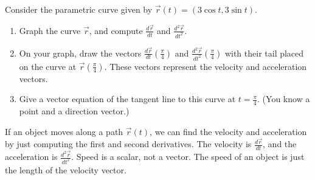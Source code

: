 \begin{problem}  
%
Consider the parametric curve given by $\vec r(t)=( 3\cos t, 3\sin t )$. 
\begin{enumerate}
\item Graph the curve $\vec r$, and compute $\frac{d\vec r}{dt}$ and $\frac{d^2\vec r}{dt^2}$. 
\item On your graph, draw the vectors $\frac{d\vec r}{dt}\left(\frac{\pi}{4}\right)$ and $\frac{d^2\vec r}{dt^2}\left(\frac{\pi}{4}\right)$ with their tail placed on the curve at $\vec r\left(\frac{\pi}{4}\right)$. These vectors represent the velocity and acceleration vectors.
\item Give a vector equation of the tangent line to this curve at $t=\frac{\pi}{4}$. (You know a point and a direction vector.)
\end{enumerate}
\end{problem}

\begin{definition}\label{definition velocity acceleration}
If an object moves along a path $\vec r(t)$, we can find the velocity and acceleration by just computing the first and second derivatives. The velocity is $\frac{d\vec r}{dt}$, and the acceleration is $\frac{d^2\vec r}{dt^2}$. Speed is a scalar, not a vector. The speed of an object is just the length of the velocity vector.
\end{definition}

